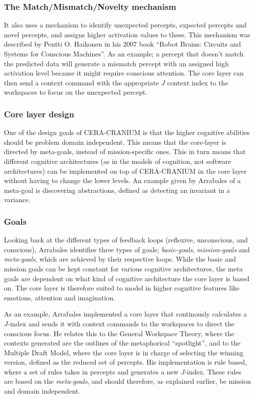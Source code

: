 \subsubsection{The Match/Mismatch/Novelty mechanism}
It also uses a mechanism to identify unexpected percepts, expected percepts and
novel percepts, and assigns higher activation values to these. This mechanism
was described by Pentti O. Haikonen in his 2007 book ``Robot Brains: Circuits
and Systems for Conscious Machines''\cite{haikonen2007robotbrains}. As an
example; a percept that doesn't match the predicted data will generate a
mismatch percept with an assigned high activation level because it might
require conscious attention. The core layer can then send a context command
with the appropriate $J$ context index to the workspaces to focus on the
unexpected percept.

\subsubsection{Core layer design}
One of the design goals of CERA-CRANIUM is that the higher cognitive abilities
should be problem domain independent.\cite{arrabales2009ceracranium} This means
that the core-layer is directed by meta-goals, instead of mission-specific ones.
This in turn means that different cognitive architectures (as in the models of
cognition, not software architectures) can be implemented on top of CERA-CRANIUM
in the core layer without having to change the lower levels. An example given by
Arrabales of a meta-goal is discovering abstractions, defined as detecting an
invariant in a variance.

\subsubsection{Goals}
Looking back at the different types of feedback loops (reflexive, unconscious,
and conscious), Arrabales identifies three types of goals;
\textit{basic-goals}, \textit{mission-goals} and \textit{meta-goals}, which are
achieved by their respective loops. While the basic and mission goals can be
kept constant for various cognitive architectures, the meta goals are dependent
on what kind of cognitive architecture the core layer is based on. The core
layer is therefore suited to model in higher cognitive features like emotions,
attention and imagination.

As an example, Arrabales implemented a core layer that continously calculates
a $J$-index and sends it with context commands to the workspaces to direct the
conscious focus. He relates this to the General Workspace Theory, where the
contexts generated are the outlines of the metaphorical ``spotlight'', and to
the Multiple Draft Model, where the core layer is in charge of selecting the
winning version, defined as the reduced set of percepts. His implementation is
rule based, where a set of rules takes in percepts and generates a new
$J$-index. These rules are based on the \textit{meta-goals}, and should
therefore, as explained earlier, be mission and domain independent.